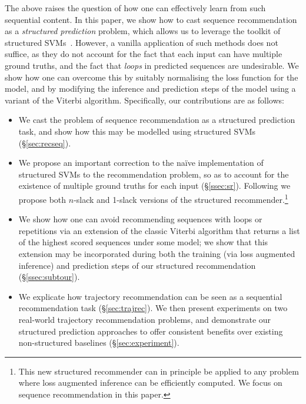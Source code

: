 The above raises the question of how one can effectively learn from such sequential content.
In this paper, we show how to cast sequence recommendation as a \emph{structured prediction} problem,
which allows us to leverage the toolkit of structured SVMs~\citep{tsochantaridis2005large}.
However, a vanilla application of such methods does not suffice,
as they do not account for the fact that each input can have multiple ground truths,
and the fact that \emph{loops} in predicted sequences are undesirable.
We show how one can overcome this by
suitably normalising the loss function for the model,
and by modifying the inference and prediction steps of the model using a variant of the Viterbi algorithm.
Specifically, our contributions are as follows:
\begin{itemize}[noitemsep]\itemmoveup
	\item We cast the problem of sequence recommendation as a structured prediction task, and show how this may be modelled using structured SVMs (\S\ref{sec:recseq}).
	\item We propose an important correction to the na\"{i}ve implementation of structured SVMs to the recommendation problem, so as to account for the existence of multiple ground truths for each input (\S\ref{ssec:sr}). Following \citet{joachims2009cutting} we propose both $n$-slack and 1-slack versions of the structured recommender.\footnote{This new structured recommender can in principle be applied to any problem where loss augmented inference can be efficiently computed. We focus on sequence recommendation in this paper.}
	\item We show how one can avoid recommending sequences with loops or repetitions via an extension of the classic Viterbi algorithm that returns a list of the highest scored sequences under some model; we show that this extension may be incorporated during both the training (via loss augmented inference) and prediction steps of our structured recommendation (\S\ref{ssec:subtour}).
	\item We explicate how trajectory recommendation can be seen as a sequential recommendation task (\S\ref{sec:trajrec}). We then present experiments on two real-world trajectory recommendation problems, and demonstrate our structured prediction approaches to offer consistent benefits over existing non-structured baselines (\S\ref{sec:experiment}).\itemmoveup
\end{itemize}


